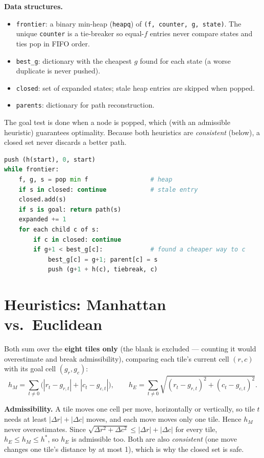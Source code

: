 \documentclass[11pt,a4paper]{article}
\begin{document}
\textbf{Data structures.}
\begin{itemize}[nosep]
\item \texttt{frontier}: a binary min-heap (\texttt{heapq}) of \texttt{(f, counter, g, state)}. The unique \texttt{counter} is a tie-breaker so equal-$f$ entries never compare states and ties pop in FIFO order.
\item \texttt{best\_g}: dictionary with the cheapest $g$ found for each state (a worse duplicate is never pushed).
\item \texttt{closed}: set of expanded states; stale heap entries are skipped when popped.
\item \texttt{parents}: dictionary for path reconstruction.
\end{itemize}
The goal test is done when a node is popped, which (with an admissible heuristic) guarantees optimality. Because both heuristics are \emph{consistent} (below), a closed set never discards a better path.

\begin{lstlisting}[language=Python,title={A* pseudocode}]
push (h(start), 0, start)
while frontier:
    f, g, s = pop min f                 # heap
    if s in closed: continue            # stale entry
    closed.add(s)
    if s is goal: return path(s)
    expanded += 1
    for each child c of s:
        if c in closed: continue
        if g+1 < best_g[c]:             # found a cheaper way to c
            best_g[c] = g+1; parent[c] = s
            push (g+1 + h(c), tiebreak, c)
\end{lstlisting}

\section{Heuristics: Manhattan vs.\ Euclidean}
Both sum over the \textbf{eight tiles only} (the blank is excluded --- counting it would overestimate and break admissibility), comparing each tile's current cell $(r,c)$ with its goal cell $(g_r,g_c)$:
\[h_{M}=\sum_{t\neq0}\big(|r_t-g_{r,t}|+|c_t-g_{c,t}|\big),\qquad h_{E}=\sum_{t\neq0}\sqrt{(r_t-g_{r,t})^2+(c_t-g_{c,t})^2}.\]

\textbf{Admissibility.} A tile moves one cell per move, horizontally or vertically, so tile $t$ needs at least $|\Delta r|+|\Delta c|$ moves, and each move moves only one tile. Hence $h_M$ never overestimates. Since $\sqrt{\Delta r^2+\Delta c^2}\le|\Delta r|+|\Delta c|$ for every tile, $h_E\le h_M\le h^*$, so $h_E$ is admissible too. Both are also \emph{consistent} (one move changes one tile's distance by at most 1), which is why the closed set is safe.
\end{document}
